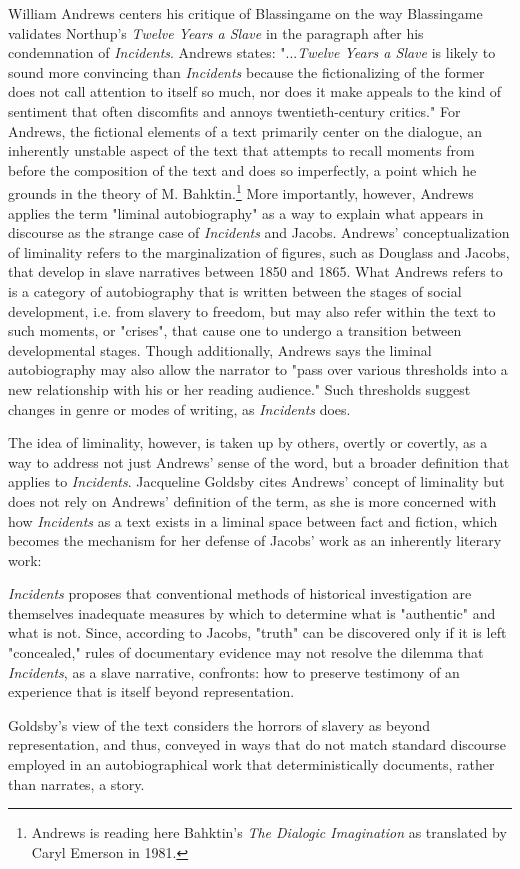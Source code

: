 William Andrews centers his critique of Blassingame on the way Blassingame validates Northup's \textit{Twelve Years a Slave} in the paragraph after his condemnation of \textit{Incidents}. Andrews states: "...\textit{Twelve Years a Slave} is likely to sound more convincing than \textit{Incidents} because the fictionalizing of the former does not call attention to itself so much, nor does it make appeals to the kind of sentiment that often discomfits and annoys twentieth-century critics." \autocite[270]{andrews_tell_1986} For Andrews, the fictional elements of a text primarily center on the dialogue, an inherently unstable aspect of the text that attempts to recall moments from before the composition of the text and does so imperfectly, a point which he grounds in the theory of M. Bahktin.\footnote{Andrews is reading here Bahktin's \textit{The Dialogic Imagination} as translated by Caryl Emerson in 1981.\autocite[329]{andrews_tell_1986}} More importantly, however, Andrews applies the term "liminal autobiography" as a way to explain what appears in discourse as the strange case of \textit{Incidents} and Jacobs. Andrews' conceptualization of liminality refers to the marginalization of figures, such as Douglass and Jacobs, that develop in slave narratives between 1850 and 1865. What Andrews refers to is a category of autobiography that is written between the stages of social development, i.e. from slavery to freedom, but may also refer within the text to such moments, or "crises", that cause one to undergo a transition between developmental stages. Though additionally, Andrews says the liminal autobiography may also allow the narrator to "pass over various thresholds into a new relationship with his or her reading audience."\autocite[178]{andrews_tell_1986} Such thresholds suggest changes in genre or modes of writing, as \textit{Incidents} does.

The idea of liminality, however, is taken up by others, overtly or covertly, as a way to address not just Andrews' sense of the word, but a broader definition that applies to \textit{Incidents}. Jacqueline Goldsby cites Andrews' concept of liminality but does not rely on Andrews' definition of the term, as she is more concerned with how \textit{Incidents} as a text exists in a liminal space between fact and fiction, which becomes the mechanism for her defense of Jacobs' work as an inherently literary work: 
\begin{displayquote}
\textit{Incidents} proposes that conventional methods of historical investigation are themselves inadequate measures by which to determine what is "authentic" and what is not. Since, according to Jacobs, "truth" can be discovered only if it is left "concealed," rules of documentary evidence may not resolve the dilemma that \textit{Incidents}, as a slave narrative, confronts: how to preserve testimony of an experience that is itself beyond representation.\autocite[12]{jacqueline_goldsby_``i_1996}
\end{displayquote}
Goldsby's view of the text considers the horrors of slavery as beyond representation, and thus, conveyed in ways that do not match standard discourse employed in an autobiographical work that deterministically documents, rather than narrates, a story. 

